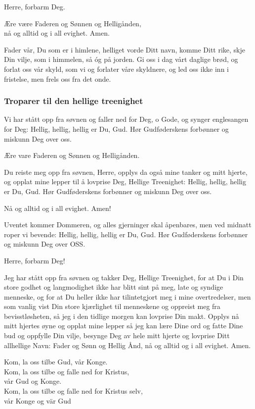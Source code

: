 Herre, forbarm Deg. 

Ære være Faderen og Sønnen og Helligånden,\\
nå og alltid og i all evighet. Amen.

Fader vår, Du som er i himlene, helliget vorde Ditt navn, komme Ditt rike, skje Din vilje, som i himmelen, så óg på jorden. Gi oss i dag vårt daglige brød, og forlat oss vår skyld, som vi og forlater våre skyldnere, og led oss ikke inn i fristelse, men frels oss fra det onde.

\subsubsection{Troparer til den hellige treenighet}

Vi har stått opp fra søvnen og faller ned for Deg, o Gode, og synger englesangen for Deg: Hellig, hellig, hellig er Du, Gud. Hør Gudføderskens forbønner og miskunn Deg over oss.

Ære vare Faderen og Sønnen og Helligånden.

Du reiste meg opp fra søvnen, Herre, opplys da også mine tanker og mitt hjerte, og opplat mine lepper til å lovprise Deg, Hellige Treenighet: Hellig, hellig, hellig er Du, Gud. Hør Gudføderskens forbønner og miskunn Deg over oss.

Nå og alltid og i all evighet. Amen!

Uventet kommer Dommeren, og alles gjerninger skal åpenbares, men ved midnatt roper vi bevende: Hellig, hellig, hellig er Du, Gud. Hør Gudføderskens forbønner og miskunn Deg over OSS.

Herre, forbarm Deg! 

Jeg har stått opp fra søvnen og takker Deg, Hellige Treenighet, for at Du i Din store godhet og langmodighet ikke har blitt sint på meg, late og syndige menneske, og for at Du heller ikke har tilintetgjort meg i mine overtredelser, men som vanlig vist Din store kjærlighet til menneskene og oppreist meg fra bevisstløsheten, så jeg i den tidlige morgen kan lovprise Din makt. Opplys nå mitt hjertes øyne og opplat mine lepper så jeg kan lære Dine ord og fatte Dine bud og oppfylle Din vilje, besynge Deg av hele mitt hjerte og lovprise Ditt allhellige Navn: Fader og Sønn og Hellig Ånd, nå og alltid og i all evighet. Amen.

Kom, la oss tilbe Gud, vår Konge.\\
Kom, la oss tilbe og falle ned for Kristus,\\
\customPrayerIndent vår Gud og Konge.\\
Kom, la oss tilbe og falle ned for Kristus selv,\\ 
\customPrayerIndent vår Konge og vär Gud

